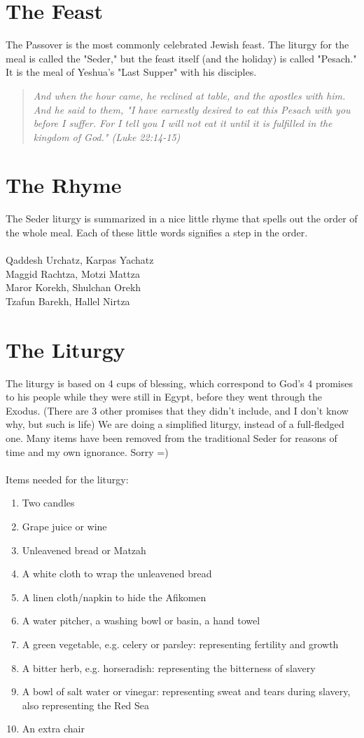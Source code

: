 \documentclass[10pt,oneside,footinclude=true,headinclude=true]{scrbook} %
\newcommand\quot[1]{
	\begin{quote}\textit{\small#1}\end{quote}
}
\begin{document}
\section{The Feast}
The Passover is the most commonly celebrated Jewish feast. The liturgy for the meal is called the "Seder," but the feast itself (and the holiday) is called "Pesach." It is the meal of Yeshua's "Last Supper" with his disciples.

\quot{And when the hour came, he reclined at table, and the apostles with him. And he said to them, "I have earnestly desired to eat this Pesach with you before I suffer. For I tell you I will not eat it until it is fulfilled in the kingdom of God." (Luke 22:14-15)}


\section{The Rhyme}

The Seder liturgy is summarized in a nice little rhyme that spells out the order of the whole meal. Each of these little words signifies a step in the order.\\
\\
Qaddesh Urchatz, Karpas Yachatz\\
Maggid Rachtza, Motzi Mattza\\
Maror Korekh, Shulchan Orekh\\
Tzafun Barekh, Hallel Nirtza


\section{The Liturgy}

The liturgy is based on 4 cups of blessing, which correspond to God's 4 promises to his people while they were still in Egypt, before they went through the Exodus. (There are 3 other promises that they didn't include, and I don't know why, but such is life) We are doing a simplified liturgy, instead of a full-fledged one. Many items have been removed from the traditional Seder for reasons of time and my own ignorance. Sorry =)\\
\\
Items needed for the liturgy:
\begin{enumerate}
	\item{Two candles}
	\item{Grape juice or wine}
	\item{Unleavened bread or Matzah}
	\item{A white cloth to wrap the unleavened bread}
	\item{A linen cloth/napkin to hide the Afikomen}
	\item{A water pitcher, a washing bowl or basin, a hand towel}
	\item{A green vegetable, e.g. celery or parsley: representing fertility and growth}
	\item{A bitter herb, e.g. horseradish: representing the bitterness of slavery}
	\item{A bowl of salt water or vinegar: representing sweat and tears during slavery, also representing the Red Sea}
	\item{An extra chair}
\end{enumerate}
\end{document}
